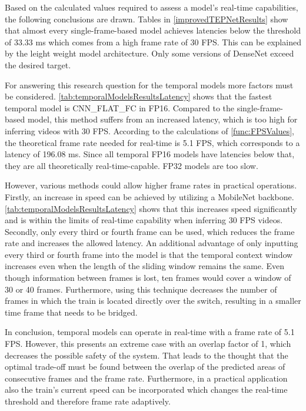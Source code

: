 Based on the calculated values required to assess a model's real-time capabilities, the following conclusions are drawn.
Tables in \autoref{improvedTEPNetResults} show that almost every single-frame-based model achieves latencies below the threshold of 33.33 ms which comes from a high frame rate of 30 \ac{FPS}.
This can be explained by the leight weight model architecture.
Only some versions of DenseNet exceed the desired target.

For answering this research question for the temporal models more factors must be considered.
\autoref{tab:temporalModelsResultsLatency} shows that the fastest temporal model is CNN\_FLAT\_FC in FP16.
Compared to the single-frame-based model, this method suffers from an increased latency, which is too high for inferring videos with 30 \ac{FPS}.
According to the calculations of \autoref{func:FPSValues}, the theoretical frame rate needed for real-time is 5.1 \ac{FPS}, which corresponds to a latency of 196.08 ms.
Since all temporal FP16 models have latencies below that, they are all theoretically real-time-capable.
FP32 models are too slow.

However, various methods could allow higher frame rates in practical operations.
Firstly, an increase in speed can be achieved by utilizing a MobileNet backbone.
\autoref{tab:temporalModelsResultsLatency} shows that this increases speed significantly and is within the limits of real-time capability when inferring 30 \ac{FPS} videos.
Secondly, only every third or fourth frame can be used, which reduces the frame rate and increases the allowed latency.
An additional advantage of only inputting every third or fourth frame into the model is that the temporal context window increases even when the length of the sliding window remains the same.
Even though information between frames is lost, ten frames would cover a window of 30 or 40 frames.
Furthermore, using this technique decreases the number of frames in which the train is located directly over the switch, resulting in a smaller time frame that needs to be bridged.

In conclusion, temporal models can operate in real-time with a frame rate of 5.1 \ac{FPS}.
However, this presents an extreme case with an overlap factor of 1, which decreases the possible safety of the system.
That leads to the thought that the optimal trade-off must be found between the overlap of the predicted areas of consecutive frames and the frame rate.
Furthermore, in a practical application also the train's current speed can be incorporated which changes the real-time threshold and therefore frame rate adaptively.

